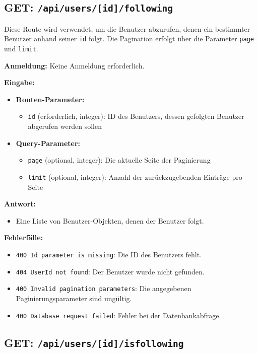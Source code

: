 \documentclass[a4paper,12pt]{article}
\begin{document}
\newpage
\subsection{GET: \texttt{/api/users/[id]/following}}

Diese Route wird verwendet, um die Benutzer abzurufen, denen ein bestimmter
Benutzer anhand seiner \texttt{id} folgt. Die Pagination erfolgt über die
Parameter \texttt{page} und \texttt{limit}.

\textbf{Anmeldung:} Keine Anmeldung erforderlich.

\textbf{Eingabe:}
\begin{itemize}
    \item \textbf{Routen-Parameter:}
    \begin{itemize}
        \item \texttt{id} (erforderlich, integer):
            ID des Benutzers, dessen gefolgten Benutzer abgerufen werden sollen
    \end{itemize}
    \item \textbf{Query-Parameter:}
    \begin{itemize}
        \item \texttt{page} (optional, integer):
            Die aktuelle Seite der Paginierung
        \item \texttt{limit} (optional, integer):
            Anzahl der zurückzugebenden Einträge pro Seite
    \end{itemize}
\end{itemize}

\textbf{Antwort:}
\begin{itemize}
    \item Eine Liste von Benutzer-Objekten, denen der Benutzer folgt.
\end{itemize}

\textbf{Fehlerfälle:}
\begin{itemize}
    \item \texttt{400 Id parameter is missing}:
        Die ID des Benutzers fehlt.
    \item \texttt{404 UserId not found}:
        Der Benutzer wurde nicht gefunden.
    \item \texttt{400 Invalid pagination parameters}:
        Die angegebenen Paginierungsparameter sind ungültig.
    \item \texttt{400 Database request failed}:
        Fehler bei der Datenbankabfrage.
\end{itemize}

\newpage
\subsection{GET: \texttt{/api/users/[id]/isfollowing}}
\end{document}
